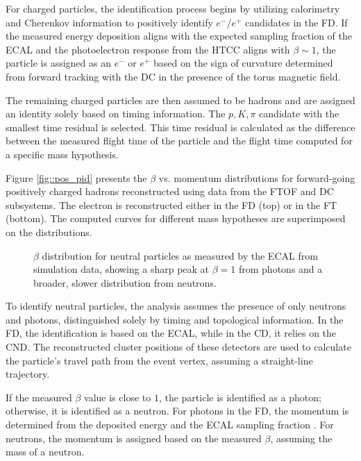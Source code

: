     For charged particles, the identification process begins by utilizing calorimetry and Cherenkov information to positively identify $e^-/e^+$ candidates in the FD.
    If the measured energy deposition aligns with the expected sampling fraction of the ECAL and the photoelectron response from the HTCC aligns with $\beta \sim 1$, the particle is assigned as an $e^-$ or $e^+$ based on the sign of curvature determined from forward tracking with the DC in the presence of the torus magnetic field.

    The remaining charged particles are then assumed to be hadrons and are assigned an identity solely based on timing information.
    The $p, K, \pi$ candidate with the smallest time residual is selected.
    This time residual is calculated as the difference between the measured flight time of the particle and the flight time computed for a specific mass hypothesis.

    Figure \ref{fig::pos_pid} presents the $\beta$ vs. momentum distributions for forward-going positively charged hadrons reconstructed using data from the FTOF and DC subsystems.
    The electron is reconstructed either in the FD (top) or in the FT (bottom).
    The computed curves for different mass hypotheses are superimposed on the distributions.

    \begin{wrapfigure}{r}{0.50\textwidth}
        \centering{}
        \caption[$\beta$ distribution of neutrals.]{$\beta$ distribution for neutral particles as measured by the ECAL from simulation data, showing a sharp peak at $\beta = 1$ from photons and a broader, slower distribution from neutrons.
        }
        \label{fig::n_gamma}
    \end{wrapfigure}

    To identify neutral particles, the analysis assumes the presence of only neutrons and photons, distinguished solely by timing and topological information.
    In the FD, the identification is based on the ECAL, while in the CD, it relies on the CND.
    The reconstructed cluster positions of these detectors are used to calculate the particle's travel path from the event vertex, assuming a straight-line trajectory.

    If the measured $\beta$ value is close to $1$, the particle is identified as a photon; otherwise, it is identified as a neutron.
    For photons in the FD, the momentum is determined from the deposited energy and the ECAL sampling fraction \cite{asryan2020}.
    For neutrons, the momentum is assigned based on the measured $\beta$, assuming the mass of a neutron.

